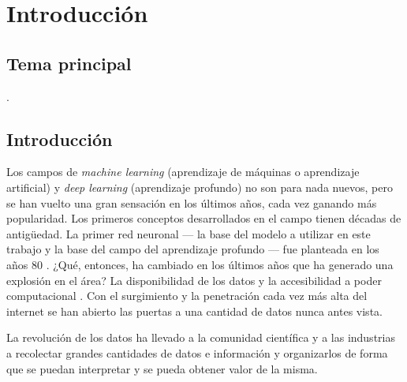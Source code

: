 
\chapter{Introducción} %

\label{Chapter1} %


\newcommand{\keyword}[1]{\textbf{#1}}
\newcommand{\tabhead}[1]{\textbf{#1}}
\newcommand{\code}[1]{\texttt{#1}}
\newcommand{\file}[1]{\texttt{\bfseries#1}}
\newcommand{\option}[1]{\texttt{\itshape#1}}


\section{Tema principal}

\ttitle.



\section{Introducción}

Los campos de \emph{\gls{machine learning}} (aprendizaje de máquinas o aprendizaje artificial) y \emph{\gls{deep learning}} (\gls{aprendizaje profundo}) \parencite{lecun2015deep} no son para nada nuevos, pero se han vuelto una gran sensación en los últimos años, cada vez ganando más popularidad. Los primeros conceptos desarrollados en el campo tienen décadas de antigüedad. La primer \gls{red neuronal} --- la base del modelo a utilizar en este trabajo y la base del campo del aprendizaje profundo --- fue planteada en los años 80 \parencite{werbos1982applications}. ¿Qué, entonces, ha cambiado en los últimos años que ha generado una explosión en el área? La disponibilidad de los datos y la accesibilidad a poder computacional \parencite{jordan2015machine}. Con el surgimiento y la penetración cada vez más alta del internet se han abierto las puertas a una cantidad de datos nunca antes vista.

La revolución de los datos ha llevado a la comunidad científica y a las industrias a recolectar grandes cantidades de datos e información y organizarlos de forma que se puedan interpretar y se pueda obtener valor de la misma.

